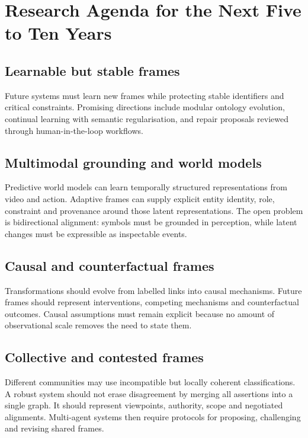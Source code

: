 \documentclass[11pt,a4paper]{article}
\begin{document}
\section{Research Agenda for the Next Five to Ten Years}

\subsection{Learnable but stable frames}

Future systems must learn new frames while protecting stable identifiers and
critical constraints. Promising directions include modular ontology evolution,
continual learning with semantic regularisation, and repair proposals reviewed
through human-in-the-loop workflows.

\subsection{Multimodal grounding and world models}

Predictive world models can learn temporally structured representations from
video and action. Adaptive frames can supply explicit entity identity, role,
constraint and provenance around those latent representations. The open problem
is bidirectional alignment: symbols must be grounded in perception, while latent
changes must be expressible as inspectable events.

\subsection{Causal and counterfactual frames}

Transformations should evolve from labelled links into causal mechanisms.
Future frames should represent interventions, competing mechanisms and
counterfactual outcomes. Causal assumptions must remain explicit because no
amount of observational scale removes the need to state them.

\subsection{Collective and contested frames}

Different communities may use incompatible but locally coherent classifications.
A robust system should not erase disagreement by merging all assertions into a
single graph. It should represent viewpoints, authority, scope and negotiated
alignments. Multi-agent systems then require protocols for proposing,
challenging and revising shared frames.
\end{document}
